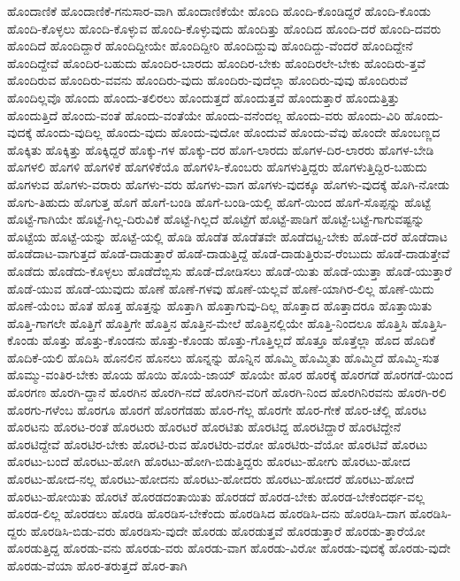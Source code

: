 {ಹೊಂದಾಣಿಕೆ
ಹೊಂದಾಣಿಕೆ-ಗನುಸಾರ-ವಾಗಿ
ಹೊಂದಾಣಿಕೆಯೇ
ಹೊಂದಿ
ಹೊಂದಿ-ಕೊಂಡಿದ್ದರೆ
ಹೊಂದಿ-ಕೊಂಡು
ಹೊಂದಿ-ಕೊಳ್ಳಲು
ಹೊಂದಿ-ಕೊಳ್ಳುವ
ಹೊಂದಿ-ಕೊಳ್ಳುವುದು
ಹೊಂದಿತ್ತು
ಹೊಂದಿದ
ಹೊಂದಿ-ದರೆ
ಹೊಂದಿ-ದವರು
ಹೊಂದಿದೆ
ಹೊಂದಿದ್ದಾರೆ
ಹೊಂದಿದ್ದೀಯೇ
ಹೊಂದಿದ್ದೀರಿ
ಹೊಂದಿದ್ದುವು
ಹೊಂದಿದ್ದು-ವೆಂದರೆ
ಹೊಂದಿದ್ದೇನೆ
ಹೊಂದಿದ್ದೇವೆ
ಹೊಂದಿರ-ಬಹುದು
ಹೊಂದಿರ-ಬಾರದು
ಹೊಂದಿರ-ಬೇಕು
ಹೊಂದಿರಲೇ-ಬೇಕು
ಹೊಂದಿರು-ತ್ತವೆ
ಹೊಂದಿರುವ
ಹೊಂದಿರು-ವವನು
ಹೊಂದಿರು-ವುದು
ಹೊಂದಿರು-ವುದೆಲ್ಲಾ
ಹೊಂದಿರು-ವುವು
ಹೊಂದಿರುವೆ
ಹೊಂದಿಲ್ಲವೊ
ಹೊಂದು
ಹೊಂದು-ತಲಿರಲು
ಹೊಂದುತ್ತದೆ
ಹೊಂದುತ್ತವೆ
ಹೊಂದುತ್ತಾರೆ
ಹೊಂದುತ್ತಿತ್ತು
ಹೊಂದುತ್ತಿದೆ
ಹೊಂದು-ವಂತೆ
ಹೊಂದು-ವಂತೆಯೇ
ಹೊಂದು-ವನೆಂದಲ್ಲ
ಹೊಂದು-ವರು
ಹೊಂದು-ವಿರಿ
ಹೊಂದು-ವುದಕ್ಕೆ
ಹೊಂದು-ವುದಿಲ್ಲ
ಹೊಂದು-ವುದು
ಹೊಂದು-ವುದೋ
ಹೊಂದುವೆ
ಹೊಂದು-ವೆವು
ಹೊಂದೇ
ಹೊಂಬಣ್ಣದ
ಹೊಕ್ಕಿತು
ಹೊಕ್ಕಿತ್ತು
ಹೊಕ್ಕಿದ್ದರೆ
ಹೊಕ್ಕು-ಗಳ
ಹೊಕ್ಕು-ದರ
ಹೊಗ-ಲಾರದು
ಹೊಗಳ-ದಿರ-ಲಾರರು
ಹೊಗಳ-ಬೇಡಿ
ಹೊಗಳಲಿ
ಹೊಗಳಿ
ಹೊಗಳಿಕೆ
ಹೊಗಳಿಕೆಯೊ
ಹೊಗಳಿಸಿ-ಕೊಂಬರು
ಹೊಗಳುತ್ತಿದ್ದರು
ಹೊಗಳುತ್ತಿದ್ದಿರ-ಬಹುದು
ಹೊಗಳುವ
ಹೊಗಳು-ವರಾರು
ಹೊಗಳು-ವರು
ಹೊಗಳು-ವಾಗ
ಹೊಗಳು-ವುದಕ್ಕೂ
ಹೊಗಳು-ವುದಕ್ಕೆ
ಹೊಗಿ-ನೋಡು
ಹೊಗು-ತಿಹುದು
ಹೊಗುತ್ತ
ಹೊಗೆ
ಹೊಗೆ-ಬಂಡಿ
ಹೊಗೆ-ಬಂಡಿ-ಯಲ್ಲಿ
ಹೊಗೆ-ಯಿಂದ
ಹೊಗೆ-ಸೊಪ್ಪನ್ನು
ಹೊಟ್ಟೆ
ಹೊಟ್ಟೆ-ಗಾಗಿಯೇ
ಹೊಟ್ಟೆ-ಗಿಲ್ಲ-ದಿರುವಿಕೆ
ಹೊಟ್ಟೆ-ಗಿಲ್ಲದೆ
ಹೊಟ್ಟೆಗೆ
ಹೊಟ್ಟೆ-ಪಾಡಿಗೆ
ಹೊಟ್ಟೆ-ಬಟ್ಟೆ-ಗಾಗುವಷ್ಟನ್ನು
ಹೊಟ್ಟೆಯ
ಹೊಟ್ಟೆ-ಯನ್ನು
ಹೊಟ್ಟೆ-ಯಲ್ಲಿ
ಹೊಡಿ
ಹೊಡೆತ
ಹೊಡೆತವೇ
ಹೊಡೆದಟ್ಟ-ಬೇಕು
ಹೊಡೆ-ದರೆ
ಹೊಡೆದಾಟ
ಹೊಡೆದಾಟ-ವಾಗುತ್ತದೆ
ಹೊಡೆ-ದಾಡುತ್ತಾರೆ
ಹೊಡೆ-ದಾಡುತ್ತಿದ್ದೆ
ಹೊಡೆ-ದಾಡುತ್ತಿರುವ-ರೆಂಬುದು
ಹೊಡೆ-ದಾಡುತ್ತೇವೆ
ಹೊಡೆದು
ಹೊಡೆದು-ಕೊಳ್ಳಲು
ಹೊಡೆದೆಬ್ಬಿಸು
ಹೊಡೆ-ದೋಡಿಸಲು
ಹೊಡೆ-ಯಿತು
ಹೊಡೆ-ಯುತ್ತಾ
ಹೊಡೆ-ಯುತ್ತಾರೆ
ಹೊಡೆ-ಯುವ
ಹೊಡೆ-ಯುವುದು
ಹೊಣೆ
ಹೊಣೆ-ಗಳವು
ಹೊಣೆ-ಯಲ್ಲವೆ
ಹೊಣೆ-ಯಾಗಿರ-ಲಿಲ್ಲ
ಹೊಣೆ-ಯಿದು
ಹೊಣೆ-ಯೆಂಬ
ಹೊತೆ
ಹೊತ್ತ
ಹೊತ್ತನ್ನು
ಹೊತ್ತಾಗಿ
ಹೊತ್ತಾಗುವು-ದಿಲ್ಲ
ಹೊತ್ತಾದ
ಹೊತ್ತಾದರೂ
ಹೊತ್ತಾಯಿತು
ಹೊತ್ತಿ-ಗಾಗಲೇ
ಹೊತ್ತಿಗೆ
ಹೊತ್ತಿಗೇ
ಹೊತ್ತಿನ
ಹೊತ್ತಿನ-ಮೇಲೆ
ಹೊತ್ತಿನಲ್ಲಿಯೇ
ಹೊತ್ತಿ-ನಿಂದಲೂ
ಹೊತ್ತಿಸಿ
ಹೊತ್ತಿಸಿ-ಕೊಂಡು
ಹೊತ್ತು
ಹೊತ್ತು-ಕೊಂಡನು
ಹೊತ್ತು-ಕೊಂಡು
ಹೊತ್ತು-ಗೊತ್ತಿಲ್ಲದೆ
ಹೊತ್ತೂ
ಹೊತ್ತೆಲ್ಲಾ
ಹೊದ
ಹೊದಿಕೆ
ಹೊದಿಕೆ-ಯಲಿ
ಹೊದಿಸಿ
ಹೊನಲಿನ
ಹೊನಲು
ಹೊನ್ನನ್ನು
ಹೊನ್ನಿನ
ಹೊಮ್ಮಿ
ಹೊಮ್ಮಿತು
ಹೊಮ್ಮಿದೆ
ಹೊಮ್ಮಿ-ಸುತ
ಹೊಮ್ಮು-ವಂತಿರ-ಬೇಕು
ಹೊಯ
ಹೊಯಿ
ಹೊಯೆ-ಜಾಯ್
ಹೊಯೇ
ಹೊರ
ಹೊರಕ್ಕೆ
ಹೊರಗಡೆ
ಹೊರಗಡೆ-ಯಿಂದ
ಹೊರಗಣ
ಹೊರಗಿ-ದ್ದಾನೆ
ಹೊರಗಿನ
ಹೊರಗಿ-ನದೆ
ಹೊರಗಿನ-ವರಿಗೆ
ಹೊರಗಿ-ನಿಂದ
ಹೊರಗಿನಿರವನು
ಹೊರಗಿ-ರಲಿ
ಹೊರಗು-ಗಳೆಂಬ
ಹೊರಗೂ
ಹೊರಗೆ
ಹೊರಗೆಡಹು
ಹೊರ-ಗೆಲ್ಲ
ಹೊರಗೇ
ಹೊರ-ಗೇಕೆ
ಹೊರ-ಚೆಲ್ಲಿ
ಹೊರಟ
ಹೊರಟನು
ಹೊರಟ-ರಂತೆ
ಹೊರಟರು
ಹೊರಟರೆ
ಹೊರಟಿತು
ಹೊರಟಿದ್ದ
ಹೊರಟಿದ್ದಾರೆ
ಹೊರಟಿದ್ದೇನೆ
ಹೊರಟಿದ್ದೇವೆ
ಹೊರಟಿರ-ಬೇಕು
ಹೊರಟಿ-ರುವ
ಹೊರಟಿರು-ವರೋ
ಹೊರಟಿರು-ವೆಯೋ
ಹೊರಟಿವೆ
ಹೊರಟು
ಹೊರಟು-ಬಂದೆ
ಹೊರಟು-ಹೋಗಿ
ಹೊರಟು-ಹೋಗಿ-ಬಿಡುತ್ತಿದ್ದರು
ಹೊರಟು-ಹೋಗು
ಹೊರಟು-ಹೋದ
ಹೊರಟು-ಹೋದ-ನಲ್ಲ
ಹೊರಟು-ಹೋದನು
ಹೊರಟು-ಹೋದರು
ಹೊರಟು-ಹೋದರೆ
ಹೊರಟು-ಹೋದೆ
ಹೊರಟು-ಹೋಯಿತು
ಹೊರಟೆ
ಹೊರಡದಂತಾಯಿತು
ಹೊರಡದೆ
ಹೊರಡ-ಬೇಕು
ಹೊರಡ-ಬೇಕೆಂದರ್ಥ-ವಲ್ಲ
ಹೊರಡ-ಲಿಲ್ಲ
ಹೊರಡಲು
ಹೊರಡಿ
ಹೊರಡಿಸ-ಬೇಕೆಂದು
ಹೊರಡಿಸಿದ
ಹೊರಡಿಸಿ-ದನು
ಹೊರಡಿಸಿ-ದಾಗ
ಹೊರಡಿಸಿ-ದ್ದರು
ಹೊರಡಿಸಿ-ಬಿಡು-ವರು
ಹೊರಡಿಸು-ವುದೇ
ಹೊರಡು
ಹೊರಡುತ್ತವೆ
ಹೊರಡುತ್ತಾರೆ
ಹೊರಡು-ತ್ತಾರೆಯೋ
ಹೊರಡುತ್ತಿದ್ದ
ಹೊರಡು-ವನು
ಹೊರಡು-ವರು
ಹೊರಡು-ವಾಗ
ಹೊರಡು-ವಿರೋ
ಹೊರಡು-ವುದಕ್ಕೆ
ಹೊರಡು-ವುದೇ
ಹೊರಡು-ವೆಯಾ
ಹೊರ-ತರುತ್ತದೆ
ಹೊರ-ತಾಗಿ
}
